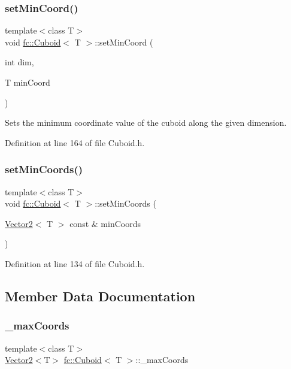 \subsubsection{\texorpdfstring{set\+Min\+Coord()}{setMinCoord()}}
{\footnotesize\ttfamily template$<$class T$>$ \\
void \hyperlink{classfc_1_1Cuboid}{fc\+::\+Cuboid}$<$ T $>$\+::set\+Min\+Coord (\begin{DoxyParamCaption}\item[{int}]{dim,  }\item[{T}]{min\+Coord }\end{DoxyParamCaption})}

Sets the minimum coordinate value of the cuboid along the given dimension. 

Definition at line 164 of file Cuboid.\+h.

\mbox{\label{classfc_1_1Cuboid_aac5bb3579d8b522254a56904e6c06a61}} 
\subsubsection{\texorpdfstring{set\+Min\+Coords()}{setMinCoords()}}
{\footnotesize\ttfamily template$<$class T$>$ \\
void \hyperlink{classfc_1_1Cuboid}{fc\+::\+Cuboid}$<$ T $>$\+::set\+Min\+Coords (\begin{DoxyParamCaption}\item[{\hyperlink{classfc_1_1Vector2}{Vector2}$<$ T $>$ const \&}]{min\+Coords }\end{DoxyParamCaption})}



Definition at line 134 of file Cuboid.\+h.



\subsection{Member Data Documentation}
\mbox{\label{classfc_1_1Cuboid_aab1d4e15fc3fae228605ff133a50acff}} 
\subsubsection{\texorpdfstring{\+\_\+max\+Coords}{\_maxCoords}}
{\footnotesize\ttfamily template$<$class T$>$ \\
\hyperlink{classfc_1_1Vector2}{Vector2}$<$T$>$ \hyperlink{classfc_1_1Cuboid}{fc\+::\+Cuboid}$<$ T $>$\+::\+\_\+max\+Coords\hspace{0.3cm}{\ttfamily [private]}}



